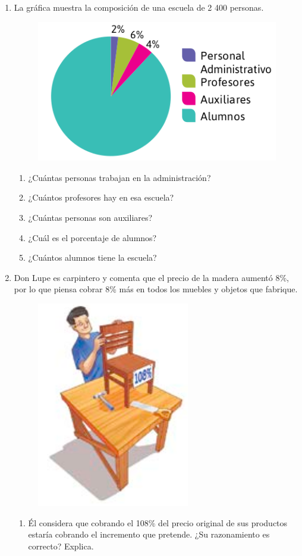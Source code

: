 \documentclass[11pt]{book}
\begin{document}
\begin{enumerate}
  \item La gráfica muestra la composición de una escuela de 2 400 personas.
        \begin{figure}[H]
          \centering
          \includegraphics[width=.5\linewidth]{escuela_pie.png}
          \label{fig:escuela_pie}
        \end{figure}
        \begin{enumerate}
          \item ¿Cuántas personas trabajan en la administración?
          \item ¿Cuántos profesores hay en esa escuela?
          \item ¿Cuántas personas son auxiliares?
          \item ¿Cuál es el porcentaje de alumnos?
          \item ¿Cuántos alumnos tiene la escuela?
        \end{enumerate}
  \item Don Lupe es carpintero y comenta que el precio de la madera aumentó 8\%, por lo
        que piensa cobrar 8\% más en todos los muebles y objetos que fabrique.
        \begin{figure}[H]
          \centering
          \includegraphics[width=.3\linewidth]{donLupe.png}
          \label{fig:donLupe}
        \end{figure}
        \begin{enumerate}
          \item Él considera que cobrando el 108\% del precio original de sus productos estaría cobrando el incremento que pretende. ¿Su razonamiento es correcto? Explica.

\end{enumerate}
\end{enumerate}
\end{document}
